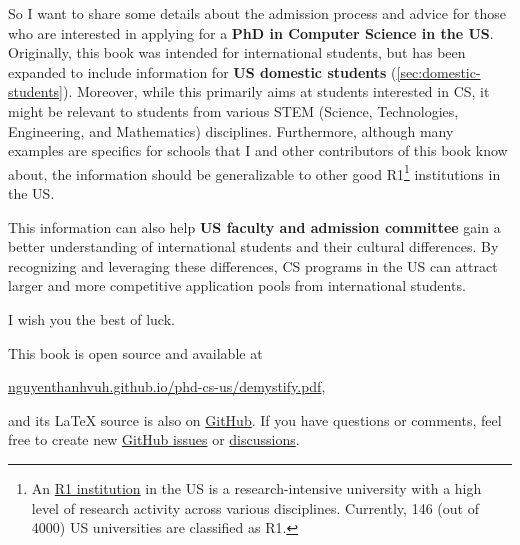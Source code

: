 \documentclass[oneside,11pt,dvipsnames]{book}
\begin{document}
So I want to share some details about the admission process and advice for those who are interested in applying for a \textbf{PhD in Computer Science in the US}.
Originally, this book was intended for international students, but has been expanded to include information for \textbf{US domestic students} (\autoref{sec:domestic-students}).
Moreover, while this primarily aims at students interested in CS, it might be relevant to students from various STEM (Science, Technologies, Engineering, and Mathematics) disciplines.
Furthermore, although many examples are specifics for schools that I and other contributors of this book know about, the information should be generalizable to other good R1\footnote{An \href{https://en.wikipedia.org/wiki/List_of_research_universities_in_the_United_States}{R1 institution} in the US is a research-intensive university with a high level of research activity across various disciplines. Currently, 146 (out of 4000) US universities are classified as R1.} institutions in the US.

This information can also help \textbf{US faculty and admission committee} gain a better understanding of international students and their cultural differences.  By recognizing and leveraging these differences, CS programs in the US can attract larger and more competitive application pools from international students.

I wish you the best of luck.

\begin{mybox}
This book is open source and available at

\begin{center}
  \href{https://nguyenthanhvuh.github.io/phd-cs-us/demystify.pdf}{nguyenthanhvuh.github.io/phd-cs-us/demystify.pdf},
\end{center}

\noindent and its \LaTeX{} source is also on \href{https://github.com/nguyenthanhvuh/phd-cs-us}{GitHub}. If you have questions or comments, feel free to create new \href{https://github.com/nguyenthanhvuh/phd-cs-us/issues}{GitHub issues} or \href{https://github.com/nguyenthanhvuh/phd-cs-us/discussions}{discussions}.

\end{mybox}

\newpage
\renewcommand{\contentsname}{Contents and Summary}
\tableofcontents
\end{document}
